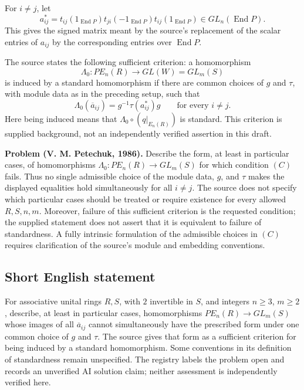 \documentclass[11pt]{article}
\begin{document}
For \(i\neq j\), let
\[
a^*_{ij}=t_{ij}(1_{\operatorname{End}P})
             t_{ji}(-1_{\operatorname{End}P})
             t_{ij}(1_{\operatorname{End}P})
\in GL_n(\operatorname{End}P).
\]
This gives the signed matrix meant by the source's replacement of the scalar entries of \(a_{ij}\) by the corresponding entries over \(\operatorname{End}P\).

The source states the following sufficient criterion: a homomorphism
\[
\Lambda_0:PE_n(R)\longrightarrow GL(W)=GL_m(S)
\]
is induced by a standard homomorphism if there are common choices of \(g\) and \(\tau\), with module data as in the preceding setup, such that
\[
\Lambda_0(\overline{a}_{ij})
 =g^{-1}\tau(a^*_{ij})g
 \qquad\text{for every }i\neq j.
\tag{C}
\]
Here being induced means that \(\Lambda_0\circ(q|_{E_n(R)})\) is standard. This criterion is supplied background, not an independently verified assertion in this draft.

\textbf{Problem (V. M. Petechuk, 1986).} Describe the form, at least in particular cases, of homomorphisms \(\Lambda_0:PE_n(R)\to GL_m(S)\) for which condition \((C)\) fails. Thus no single admissible choice of the module data, \(g\), and \(\tau\) makes the displayed equalities hold simultaneously for all \(i\neq j\). The source does not specify which particular cases should be treated or require existence for every allowed \(R,S,n,m\). Moreover, failure of this sufficient criterion is the requested condition; the supplied statement does not assert that it is equivalent to failure of standardness. A fully intrinsic formulation of the admissible choices in \((C)\) requires clarification of the source's module and embedding conventions.
\subsection{Short English statement}
For associative unital rings \(R,S\), with \(2\) invertible in \(S\), and integers \(n\geq3\), \(m\geq2\), describe, at least in particular cases, homomorphisms \(PE_n(R)\to GL_m(S)\) whose images of all \(\overline{a}_{ij}\) cannot simultaneously have the prescribed form under one common choice of \(g\) and \(\tau\). The source gives that form as a sufficient criterion for being induced by a standard homomorphism. Some conventions in its definition of standardness remain unspecified. The registry labels the problem open and records an unverified AI solution claim; neither assessment is independently verified here.
\end{document}
